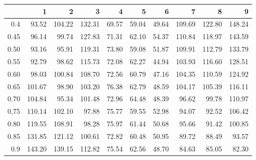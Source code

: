 \begin{table}[ht]
\centering
\begin{tabular}{rrrrrrrrrr}
  \hline
 & 1 & 2 & 3 & 4 & 5 & 6 & 7 & 8 & 9 \\ 
  \hline
0.4 & 93.52 & 104.22 & 132.31 & 69.57 & 59.04 & 49.64 & 109.69 & 122.80 & 148.24 \\ 
  0.45 & 96.14 & 99.74 & 127.83 & 71.31 & 62.10 & 54.37 & 110.84 & 118.97 & 143.59 \\ 
  0.50 & 93.16 & 95.91 & 119.31 & 73.80 & 59.08 & 51.87 & 109.91 & 112.79 & 133.79 \\ 
  0.55 & 92.79 & 98.62 & 115.73 & 72.08 & 62.27 & 44.94 & 103.93 & 116.60 & 128.51 \\ 
  0.60 & 98.03 & 100.84 & 108.70 & 72.56 & 60.79 & 47.16 & 104.35 & 110.59 & 124.92 \\ 
  0.65 & 101.67 & 98.90 & 103.20 & 76.38 & 62.79 & 48.59 & 104.17 & 105.39 & 116.11 \\ 
  0.70 & 104.84 & 95.34 & 101.48 & 72.96 & 64.48 & 48.39 & 96.62 & 99.78 & 110.97 \\ 
  0,75 & 110.14 & 102.10 & 97.88 & 75.77 & 59.55 & 52.98 & 94.07 & 92.52 & 106.42 \\ 
  0.80 & 119.55 & 108.91 & 98.28 & 75.97 & 61.44 & 50.68 & 95.66 & 91.42 & 100.85 \\ 
  0.85 & 131.85 & 121.12 & 100.61 & 72.82 & 60.48 & 50.95 & 89.72 & 88.49 & 93.57 \\ 
  0.9 & 143.20 & 139.15 & 112.82 & 75.54 & 62.56 & 48.70 & 84.63 & 85.05 & 82.30 \\ 
   \hline
\end{tabular}
\end{table}
